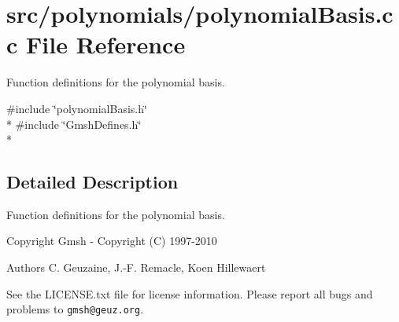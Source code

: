 \section{src/polynomials/polynomial\-Basis.cc File Reference}
\label{polynomialBasis_8cc}


Function definitions for the polynomial basis.  


{\ttfamily \#include \char`\"{}polynomial\-Basis.\-h\char`\"{}}\\*
{\ttfamily \#include \char`\"{}Gmsh\-Defines.\-h\char`\"{}}\\*


\subsection{Detailed Description}
Function definitions for the polynomial basis. \begin{DoxyCopyright}{Copyright}
Gmsh -\/ Copyright (C) 1997-\/2010 
\end{DoxyCopyright}
\begin{DoxyAuthor}{Authors}
C. Geuzaine, J.-\/\-F. Remacle, Koen Hillewaert
\end{DoxyAuthor}
See the L\-I\-C\-E\-N\-S\-E.\-txt file for license information. Please report all bugs and problems to {\tt gmsh@geuz.\-org}. 